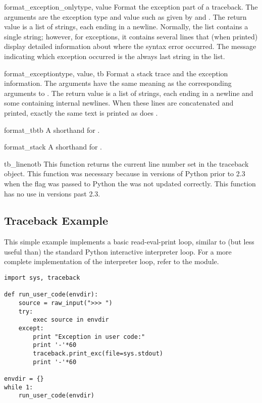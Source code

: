 \begin{funcdesc}{format_exception_only}{type, value}
Format the exception part of a traceback.  The arguments are the
exception type and value such as given by  and
.  The return value is a list of strings, each
ending in a newline.  Normally, the list contains a single string;
however, for  exceptions, it contains several
lines that (when printed) display detailed information about where the
syntax error occurred.  The message indicating which exception
occurred is the always last string in the list.
\end{funcdesc}

\begin{funcdesc}{format_exception}{type, value, tb}
Format a stack trace and the exception information.  The arguments 
have the same meaning as the corresponding arguments to
.  The return value is a list of strings,
each ending in a newline and some containing internal newlines.  When
these lines are concatenated and printed, exactly the same text is
printed as does .
\end{funcdesc}

\begin{funcdesc}{format_tb}{tb}
A shorthand for .
\end{funcdesc}

\begin{funcdesc}{format_stack}{}
A shorthand for .
\end{funcdesc}

\begin{funcdesc}{tb_lineno}{tb}
This function returns the current line number set in the traceback
object.  This function was necessary because in versions of Python
prior to 2.3 when the  flag was passed to Python the
 was not updated correctly.  This function
has no use in versions past 2.3.
\end{funcdesc}


\subsection{Traceback Example \label{traceback-example}}

This simple example implements a basic read-eval-print loop, similar
to (but less useful than) the standard Python interactive interpreter
loop.  For a more complete implementation of the interpreter loop,
refer to the  module.

\begin{verbatim}
import sys, traceback

def run_user_code(envdir):
    source = raw_input(">>> ")
    try:
        exec source in envdir
    except:
        print "Exception in user code:"
        print '-'*60
        traceback.print_exc(file=sys.stdout)
        print '-'*60

envdir = {}
while 1:
    run_user_code(envdir)
\end{verbatim}
